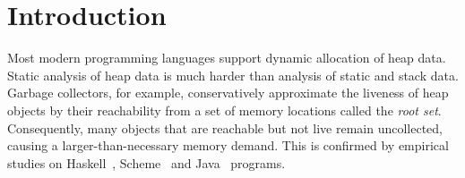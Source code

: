 \documentclass{llncs}
\begin{document}



\section{Introduction}
\label{sec:intro}

Most modern  programming languages support dynamic  allocation of heap
data.  Static  analysis of heap data  is much harder  than analysis of
static   and   stack   data.    Garbage   collectors,   for   example,
conservatively  approximate  the liveness  of  heap  objects by  their
reachability  from a  set of  memory  locations called  the {\em  root
  set\/}.  Consequently, many objects  that are reachable but not live
remain  uncollected, causing  a  larger-than-necessary memory  demand.
This is confirmed  by empirical studies on Haskell~\cite{rojemo96lag},
Scheme~\cite{karkare06effectiveness}                                and
Java~\cite{shaham02estimating} programs.
\end{document}
